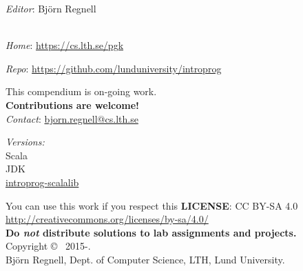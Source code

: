 
\clearpage\null\thispagestyle{empty}
\vfill

{
\setlength{\parindent}{0pt}
\emph{Editor}: Björn Regnell \\


\\ \newline

\emph{Home}: \url{https://cs.lth.se/pgk} \newline

\emph{Repo}: \url{https://github.com/lunduniversity/introprog} \\ \newline

This compendium is on-going work. \\ \textbf{Contributions are welcome!} \\
\emph{Contact}: \url{bjorn.regnell@cs.lth.se}
\\ \newline


\emph{Versions:} \\
Scala \ScalaVersion \\
JDK \JDKVersion\\
\href{https://github.com/lunduniversity/introprog-scalalib/}{introprog-scalalib} \LibVersion \\ 

\vfill

You can use this work if you respect this \textbf{LICENSE}: CC BY-SA 4.0 \\
\url{http://creativecommons.org/licenses/by-sa/4.0/} \\
\textbf{Do \emph{not} distribute solutions to lab assignments and projects.}
\\ \newline
Copyright \copyright~ 2015-\CurrentYear. \\
Björn Regnell, Dept. of Computer Science, LTH, Lund University.\\
}
